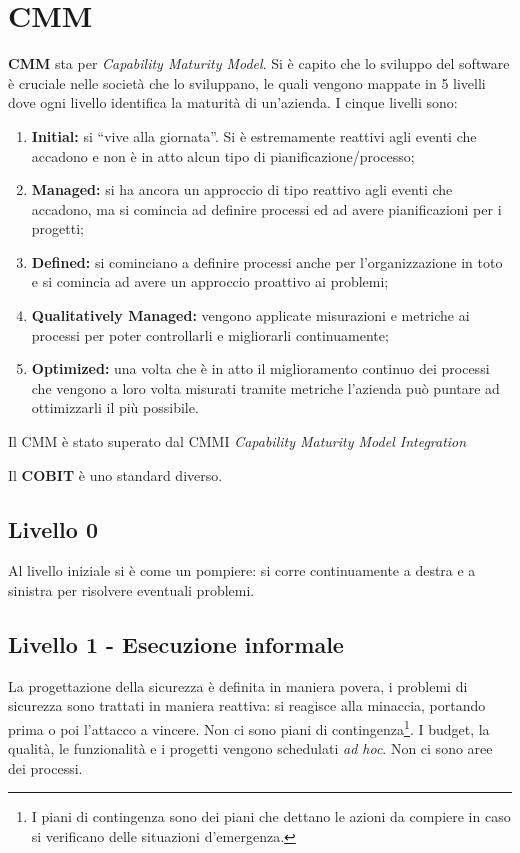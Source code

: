 \section{CMM}
\textbf{CMM} sta per \textit{Capability Maturity Model}. Si è capito che lo 
sviluppo del software è cruciale nelle società che lo sviluppano, le quali 
vengono mappate in 5 livelli dove ogni livello identifica la maturità di 
un'azienda.
I cinque livelli sono:
\begin{enumerate}
  \item \textbf{Initial:} si ``vive alla giornata''. Si è estremamente 
  reattivi agli eventi che accadono e non è in atto alcun tipo di 
  pianificazione/processo;
  \item \textbf{Managed:} si ha ancora un approccio di tipo reattivo agli 
  eventi che accadono, ma si comincia ad definire processi ed ad avere 
  pianificazioni per i progetti;
  \item \textbf{Defined:} si cominciano a definire processi anche per 
  l'organizzazione in toto e si comincia ad avere un approccio proattivo ai 
  problemi;
  \item \textbf{Qualitatively Managed:} vengono applicate misurazioni e
  metriche ai processi per poter controllarli e migliorarli continuamente;
  \item \textbf{Optimized:} una volta che è in atto il miglioramento continuo 
  dei processi che vengono a loro volta misurati tramite metriche l'azienda 
  può puntare ad ottimizzarli il più possibile.
\end{enumerate}
Il CMM è stato superato dal CMMI \textit{Capability Maturity Model Integration}


Il \textbf{COBIT} è uno standard diverso.


\subsection{Livello 0}

Al livello iniziale si è come un pompiere: si corre continuamente a destra e a
sinistra per risolvere eventuali problemi.

\subsection{Livello 1 - Esecuzione informale}

La progettazione della sicurezza è definita in maniera povera, i problemi di 
sicurezza sono trattati in maniera reattiva: si reagisce 
alla minaccia, portando prima o poi l'attacco a vincere. Non ci sono piani di 
contingenza\footnote{I piani di contingenza sono dei piani che dettano le 
azioni da compiere in caso si verificano delle situazioni d'emergenza.}. I 
budget, la qualità, le funzionalità e i progetti vengono schedulati \textit{ad 
hoc}. Non ci sono aree dei processi.

